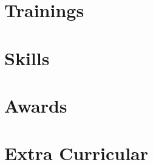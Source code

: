\documentclass[]{cv-style}          %
\begin{document}
\section{Trainings\hrulefill}

  \vspace{-0.2cm}


\section{Skills\hrulefill}


\newpage

\section{Awards\hrulefill}






\section{Extra Curricular\hrulefill}

  \vspace{-0.2cm}



\end{document}
